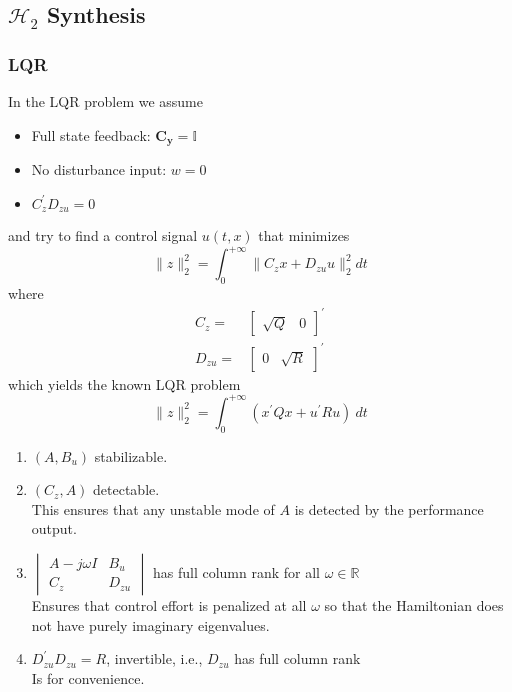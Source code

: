 \subsection{\texorpdfstring{$\mathcal{H}_2$}{H2} Synthesis}
\subsubsection{LQR}
In the LQR problem we assume
\begin{itemize}
    \item Full state feedback: $\mathbf{C_y}=\mathbf{\mathbb{I}}$
    \item No disturbance input: $w=0$
    \item $C_z^{\prime}D_{zu}=0$
\end{itemize}
and try to find a control signal $u(t,x)$ that minimizes
\begin{equation*}
    \|z\|_2^2=\int_0^{+\infty}\|C_zx+D_{zu}u\|_2^2 dt
\end{equation*}
where
\begin{align*}
    C_z=    &
    \begin{bmatrix}
        \sqrt{Q} & 0
    \end{bmatrix}^{\prime} \\
    D_{zu}= &
    \begin{bmatrix}
        0 & \sqrt{R}
    \end{bmatrix}^{\prime}
\end{align*}
which yields the known LQR problem
\begin{equation*}
    \|z\|_2^2=\int_0^{+\infty}(x^{\prime}Qx+u^{\prime}Ru)\mathrm{~}dt
\end{equation*}


\begin{enumerate}
    \item $(A,B_u)$ stabilizable.
    \item $(C_z,A)$ detectable.\\
          This ensures that any unstable mode of $A$ is detected by the performance output.
    \item $\begin{vmatrix} A- j\omega I& B_u\\ C_z& D_{zu}\end{vmatrix}$ has full column rank for all $\omega\in\mathbb{R}$\\
          Ensures that control effort is penalized at all $\omega$ so that the Hamiltonian does not have purely imaginary eigenvalues.
    \item $D_{zu}^{\prime}D_{zu}=R$, invertible, i.e., $D_{zu}$ has full column rank\\
          Is for convenience.
\end{enumerate}

